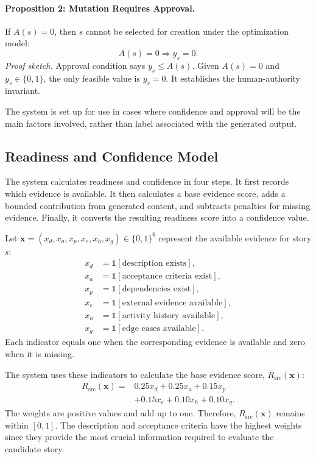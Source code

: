 \documentclass[pdflatex,sn-basic]{sn-jnl}
\begin{document}
\paragraph{Proposition 2: Mutation Requires Approval.}
If $A(s)=0$, then $s$ cannot be selected for creation under the optimization model:
\begin{equation}
A(s)=0 \Rightarrow y_s=0.
\end{equation}
\textit{Proof sketch.}
Approval condition says $y_s\le A(s)$. Given $A(s)=0$ and $y_s\in\{0,1\}$, the only feasible value is $y_s=0$. It establishes the human-authority invariant.

The system is set up for use in cases where confidence and approval will be the main factors involved, rather than label associated with the generated output.

\subsection{Readiness and Confidence Model}
\label{sec:readiness-confidence-model}

The system calculates readiness and confidence in four steps. It first records which evidence is available. It then calculates a base evidence score, adds a bounded contribution from generated content, and subtracts penalties for missing evidence. Finally, it converts the resulting readiness score into a confidence value.

Let $\mathbf{x}=(x_d,x_a,x_p,x_e,x_h,x_g)\in\{0,1\}^6$ represent the available evidence for story $s$:
\begin{align}
	x_d &= \mathbb{1}[\text{description exists}], \\
	x_a &= \mathbb{1}[\text{acceptance criteria exist}], \\
	x_p &= \mathbb{1}[\text{dependencies exist}], \\
	x_e &= \mathbb{1}[\text{external evidence available}], \\
	x_h &= \mathbb{1}[\text{activity history available}], \\
	x_g &= \mathbb{1}[\text{edge cases available}].
\end{align}
Each indicator equals one when the corresponding evidence is available and zero when it is missing.

The system uses these indicators to calculate the base evidence score, $R_{\text{src}}(\mathbf{x})$:
\begin{equation}
	\begin{aligned}
		R_{\text{src}}(\mathbf{x}) ={}& 0.25x_d + 0.25x_a + 0.15x_p \\
		&+ 0.15x_e + 0.10x_h + 0.10x_g.
	\end{aligned}
\end{equation}
The weights are positive values and add up to one. Therefore, $R_{\text{src}}(\mathbf{x})$ remains within $[0,1]$. The description and acceptance criteria have the highest weights since they provide the most crucial information required to evaluate the candidate story.
\end{document}

